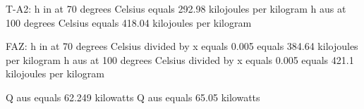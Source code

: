 T-A2:  
h in at 70 degrees Celsius equals 292.98 kilojoules per kilogram  
h aus at 100 degrees Celsius equals 418.04 kilojoules per kilogram  

FAZ:  
h in at 70 degrees Celsius divided by x equals 0.005 equals 384.64 kilojoules per kilogram  
h aus at 100 degrees Celsius divided by x equals 0.005 equals 421.1 kilojoules per kilogram  

Q aus equals 62.249 kilowatts  
Q aus equals 65.05 kilowatts